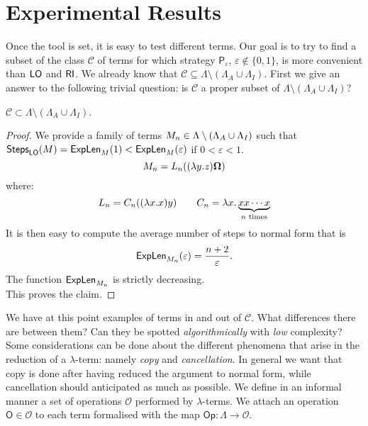 \section{Experimental Results}
Once the tool is set, it is easy to test different terms. Our goal is to try to find a subset of the class $\mathcal{C}$ of terms for which strategy $\mathsf{P}_\varepsilon$, $\varepsilon\not\in\{0,1\}$, is more convenient than $\textsf{LO}$ and $\textsf{RI}$. We already know that $\mathcal{C}\subseteq\Lambda\setminus(\Lambda_A\cup\Lambda_I)$. First we give an answer to the following trivial question: is $\mathcal{C}$ a proper subset of $\Lambda\setminus(\Lambda_A\cup\Lambda_I)$?
\begin{proposition}\label{prop:strict}
	$\mathcal{C}\subset\Lambda\setminus(\Lambda_A\cup\Lambda_I)$.
\end{proposition}
\begin{proof}
	We provide a family of terms $M_n\in\Lambda\setminus(\Lambda_A\cup\Lambda_I)$ such that $\textsf{Steps}_{\textsf{LO}}(M)=\textsf{ExpLen}_{M}(1)<\textsf{ExpLen}_{M}(\varepsilon)$ if $0<\varepsilon<1$.
	$$
	M_n=L_n((\lambda y.z)\bm{\Omega})
	$$
	where:
	$$
	L_n = C_n((\lambda x.x)y)\qquad
	C_n = \lambda  x.\underbrace{xx\cdots x}_{n\text{ times}}
	$$
	It is then easy to compute the average number of steps to normal form that is
	$$
	\textsf{ExpLen}_{M_n}(\varepsilon)=\frac{n+2}{\varepsilon}.
	$$ 
	The function $\textsf{ExpLen}_{M_n}$ is strictly decreasing.\\
	This proves the claim.
\end{proof}
We have at this point examples of terms in and out of $\mathcal{C}$. What differences there are between them? Can they be spotted \emph{algorithmically} with \emph{low} complexity? Some considerations can be done about the different phenomena that arise in the reduction of a $\lambda$-term: namely \emph{copy} and \emph{cancellation}. In general we want that copy is done after having reduced the argument to normal form, while cancellation should anticipated as much as possible. We define in an informal manner a set of operations $\mathcal{O}$ performed by $\lambda$-terms. We attach an operation $\mathsf{O}\in\mathcal{O}$ to each term formalised with the map $\mathsf{Op}:\Lambda\rightarrow\mathcal{O}$.

